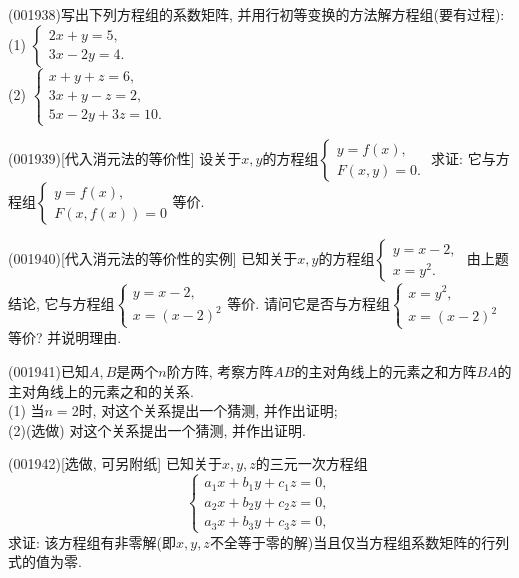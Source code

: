 \item (001938)写出下列方程组的系数矩阵, 并用行初等变换的方法解方程组(要有过程):\\ 
(1) $\left\{\begin{array}{ll}2x+y=5,\\3x-2y=4.\end{array}\right.$\\ 
(2) $\left\{\begin{array}{l}x+y+z=6,\\3x+y-z=2,\\5x-2y+3z=10.\end{array}\right.$
\item (001939)[代入消元法的等价性]
设关于$x,y$的方程组$\left\{\begin{array}{ll}y=f(x),\\F(x,y)=0.\end{array}\right.$
求证: 它与方程组$\left\{\begin{array}{ll}y=f(x),\\F(x,f(x))=0\end{array}\right.$等价.
\item (001940)[代入消元法的等价性的实例]
已知关于$x,y$的方程组$\left\{\begin{array}{ll}y=x-2,\\x=y^2.\end{array}\right.$
由上题结论, 它与方程组$\left\{\begin{array}{ll}y=x-2,\\x=(x-2)^2\end{array}\right.$等价.
请问它是否与方程组$\left\{\begin{array}{ll}x=y^2,\\x=(x-2)^2\end{array}\right.$等价? 并说明理由.
\item (001941)已知$A,B$是两个$n$阶方阵, 考察方阵$AB$的主对角线上的元素之和方阵$BA$的主对角线上的元素之和的关系.\\ 
(1) 当$n=2$时, 对这个关系提出一个猜测, 并作出证明;\\ 
(2)(选做) 对这个关系提出一个猜测, 并作出证明.
\item (001942)[选做, 可另附纸]
已知关于$x,y,z$的三元一次方程组$$\left\{\begin{array}{l}a_1x+b_1y+c_1z=0,\\a_2x+b_2y+c_2z=0,\\a_3x+b_3y+c_3z=0,\end{array}\right.$$
求证: 该方程组有非零解(即$x,y,z$不全等于零的解)当且仅当方程组系数矩阵的行列式的值为零.
